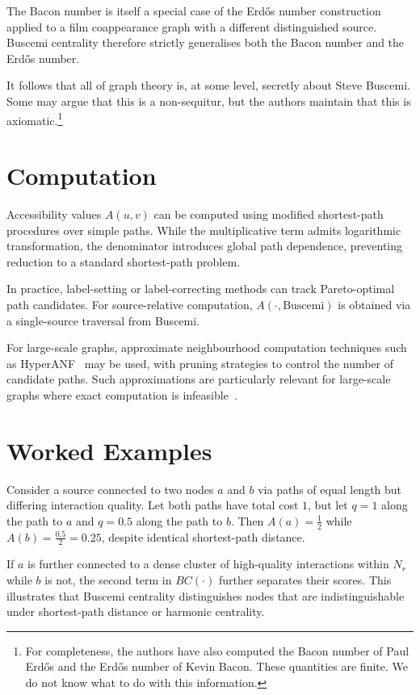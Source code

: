 \documentclass[11pt]{article}
\begin{document}
The Bacon number is itself a special case of the Erd\H{o}s number construction applied to a film coappearance graph with a different distinguished source. Buscemi centrality therefore strictly generalises both the Bacon number and the Erd\H{o}s number.

It follows that all of graph theory is, at some level, secretly about Steve Buscemi. Some may argue that this is a non-sequitur, but the authors maintain that this is axiomatic.\footnote{For completeness, the authors have also computed the Bacon number of Paul Erd\H{o}s and the Erd\H{o}s number of Kevin Bacon. These quantities are finite. We do not know what to do with this information.}

\section{Computation}

Accessibility values $A(u,v)$ can be computed using modified shortest-path procedures over simple paths. While the multiplicative term admits logarithmic transformation, the denominator introduces global path dependence, preventing reduction to a standard shortest-path problem.

In practice, label-setting or label-correcting methods can track Pareto-optimal path candidates. For source-relative computation, $A(\cdot, \text{Buscemi})$ is obtained via a single-source traversal from Buscemi.

For large-scale graphs, approximate neighbourhood computation techniques such as HyperANF~\cite{boldi2011hyperanf} may be used, with pruning strategies to control the number of candidate paths. Such approximations are particularly relevant for large-scale graphs where exact computation is infeasible~\cite{newman2010networks}.

\section{Worked Examples}

Consider a source connected to two nodes $a$ and $b$ via paths of equal length but differing interaction quality. Let both paths have total cost $1$, but let $q=1$ along the path to $a$ and $q=0.5$ along the path to $b$. Then $A(a) = \frac{1}{2}$ while $A(b) = \frac{0.5}{2} = 0.25$, despite identical shortest-path distance.

If $a$ is further connected to a dense cluster of high-quality interactions within $N_r$ while $b$ is not, the second term in $BC(\cdot)$ further separates their scores. This illustrates that Buscemi centrality distinguishes nodes that are indistinguishable under shortest-path distance or harmonic centrality.
\end{document}

